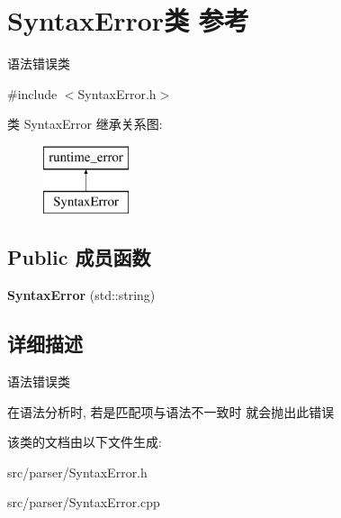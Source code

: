 \hypertarget{class_syntax_error}{}\section{Syntax\+Error类 参考}
\label{class_syntax_error}


语法错误类  




{\ttfamily \#include $<$Syntax\+Error.\+h$>$}

类 Syntax\+Error 继承关系图\+:\begin{figure}[H]
\begin{center}
\leavevmode
\includegraphics[height=2.000000cm]{class_syntax_error}
\end{center}
\end{figure}
\subsection*{Public 成员函数}
\begin{DoxyCompactItemize}
\item 
{\bfseries Syntax\+Error} (std\+::string)\hypertarget{class_syntax_error_a41285cf1cafd071040aec4382e0d7dcd}{}\label{class_syntax_error_a41285cf1cafd071040aec4382e0d7dcd}

\end{DoxyCompactItemize}


\subsection{详细描述}
语法错误类 

在语法分析时, 若是匹配项与语法不一致时 就会抛出此错误 

该类的文档由以下文件生成\+:\begin{DoxyCompactItemize}
\item 
src/parser/Syntax\+Error.\+h\item 
src/parser/Syntax\+Error.\+cpp\end{DoxyCompactItemize}
